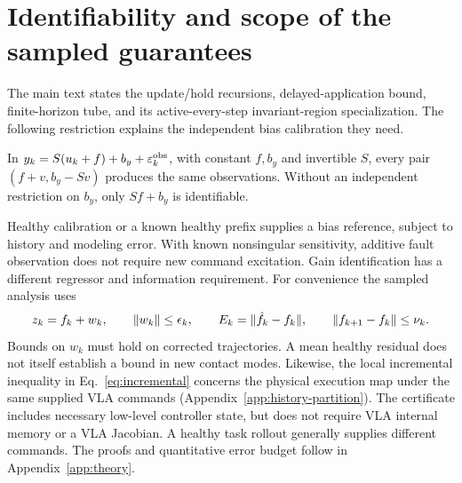 \section{Identifiability and scope of the sampled guarantees}
\label{app:implemented-theory}
The main text states the update/hold recursions, delayed-application bound,
finite-horizon tube, and its active-every-step invariant-region specialization.
The following restriction explains the independent bias calibration they need.

\begin{proposition}
\label{prop:ambiguity}
In $y_k=S(u_k+f)+b_y+\varepsilon_k^{\rm obs}$, with constant $f,b_y$ and invertible $S$,
every pair $(f+v,b_y-Sv)$ produces the same observations. Without an
independent restriction on $b_y$, only $Sf+b_y$ is identifiable.
\end{proposition}
Healthy calibration or a known healthy prefix supplies a bias reference,
subject to history and modeling error. With known nonsingular sensitivity,
additive fault observation does not require new command excitation. Gain
identification has a different regressor and information requirement.
For convenience the sampled analysis uses
\begin{equation}
z_k=f_k+w_k,\qquad \|w_k\|\le\epsilon_k,\qquad
E_k=\|\hat f_k-f_k\|,\qquad \|f_{k+1}-f_k\|\le\nu_k.
\label{eq:obsbound}
\end{equation}
Bounds on $w_k$ must hold on corrected trajectories. A mean healthy residual
does not itself establish a bound in new contact modes. Likewise, the local
incremental inequality in Eq.~\eqref{eq:incremental} concerns the physical execution map under the same supplied VLA commands
(Appendix~\ref{app:history-partition}). The certificate includes necessary
low-level controller state, but does not require VLA internal memory or a
VLA Jacobian. A healthy task rollout generally supplies different commands.
The proofs and quantitative error budget follow in Appendix~\ref{app:theory}.
